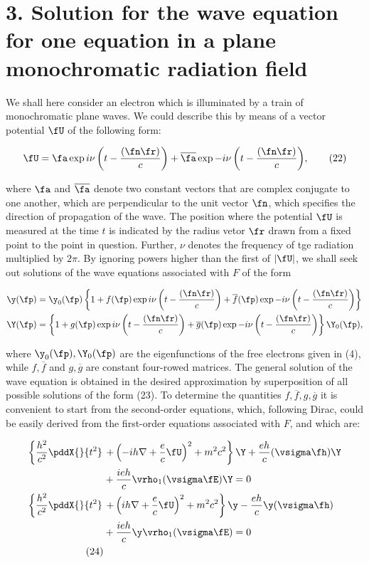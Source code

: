 \documentclass{article}
\newcommand{\nc}[2]{
  \newcommand{#1}{#2}
}
\newcommand{\nequ}[2]{
\begin{align*}
#1
\tag{#2}
\end{align*}
}
\newcommand{\uequ}[1]{
\begin{align*}
#1
\end{align*}
}
\begin{document}
\section*{3. Solution for the wave equation for one equation in a plane monochromatic radiation field}

\nc{\fabar}{\overline{\fa}}
\nc{\fbar}{\overline{f}}
\nc{\gbar}{\overline{g}}
\MV{\veta}{\eta}
\MV{\vepsilon}{\varepsilon}



We shall here consider an electron which is illuminated by a train of monochromatic plane waves. We could describe this by means of a vector potential $\fU$ of the following form:
\nequ{
\fU =    \fa\exp{i\nu\left(t-\frac{(\fn\fr)}{c}\right)}
    + \fabar\exp{-i\nu\left(t-\frac{(\fn\fr)}{c}\right)},
}{22}
where $\fa$ and $\fabar$ denote two constant vectors that are complex conjugate to one another, which are perpendicular to the unit vector $\fn$, which specifies the direction of propagation of the wave. The position where the potential $\fU$ is measured at the time $t$ is indicated by the radius vetor $\fr$ drawn from a fixed point to the point in question. Further, $\nu$ denotes the frequency of tge radiation multiplied by $2\pi$. By ignoring powers higher than the first of $|\fU|$, we shall seek out solutions of the wave equations associated with $F$ of the form
\uequ{
\y(\fp) &= \y_0(\fp)\left\{1 + f(\fp)\exp{i\nu\left(t-\frac{(\fn\fr)}{c}\right)}
 + \fbar(\fp)\exp{-i\nu\left(t-\frac{(\fn\fr)}{c}\right)}
\right\}\\
\Y(\fp) &= \left\{1 + g(\fp)\exp{i\nu\left(t-\frac{(\fn\fr)}{c}\right)}
 + \gbar(\fp)\exp{-i\nu\left(t-\frac{(\fn\fr)}{c}\right)}
\right\}\Y_0(\fp),
}
where $\y_0(\fp), \Y_0(\fp)$ are the eigenfunctions of the free electrons given in (4), while $f,\fbar$ and $g,\gbar$ are constant four-rowed matrices. The general solution of the wave equation is obtained in the desired approximation by superposition of all possible solutions of the form (23). To determine the quantities $f,\fbar,g,\gbar$ it is convenient to start from the second-order equations, which, following Dirac, could be easily derived from the first-order equations associated with $F$, and which are:
\nequ{
\left\{\frac{h^2}{c^2}\pddX{}{t^2} \right.&\left.+ \left(-ih\nabla + \frac{e}{c}\fU\right)^2 + m^2 c^2\right\}\Y
 + \frac{eh}{c}(\vsigma \fh)\Y \\
 &+ \frac{ieh}{c}\vrho_1(\vsigma \fE)\Y = 0\\
\left\{\frac{h^2}{c^2}\pddX{}{t^2} \right.&\left.+ \left(ih\nabla + \frac{e}{c}\fU\right)^2 + m^2 c^2\right\}\y
 - \frac{eh}{c}\y(\vsigma \fh) \\
 &+ \frac{ieh}{c}\y\vrho_1(\vsigma \fE) = 0\\
}{24}
\end{document}
